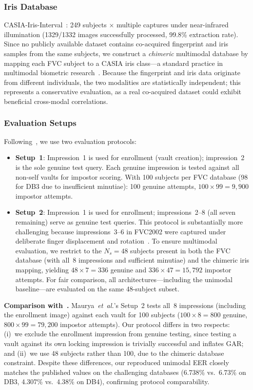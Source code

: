 \documentclass[conference]{IEEEtran}
\begin{document}
\subsubsection{Iris Database}
CASIA-Iris-Interval~\cite{casia_iris}: 249 subjects $\times$ multiple captures under near-infrared illumination (1329/1332 images successfully processed, 99.8\% extraction rate). Since no publicly available dataset contains co-acquired fingerprint and iris samples from the same subjects, we construct a \emph{chimeric} multimodal database by mapping each FVC subject to a CASIA iris class---a standard practice in multimodal biometric research~\cite{ross2003information,nandakumar2008multibiometric}. Because the fingerprint and iris data originate from different individuals, the two modalities are statistically independent; this represents a conservative evaluation, as a real co-acquired dataset could exhibit beneficial cross-modal correlations.

\subsubsection{Evaluation Setups}
Following~\cite{maurya2025enhancing}, we use two evaluation protocols:
\begin{itemize}
    \item \textbf{Setup~1}: Impression~1 is used for enrollment (vault creation); impression~2 is the sole genuine test query. Each genuine impression is tested against all non-self vaults for impostor scoring. With 100 subjects per FVC database (98 for DB3 due to insufficient minutiae): 100 genuine attempts, $100 \times 99 = 9{,}900$ impostor attempts.
    \item \textbf{Setup~2}: Impression~1 is used for enrollment; impressions~2--8 (all seven remaining) serve as genuine test queries. This protocol is substantially more challenging because impressions~3--6 in FVC2002 were captured under deliberate finger displacement and rotation~\cite{maio2002fvc2002}. To ensure multimodal evaluation, we restrict to the $N_s = 48$ subjects present in both the FVC database (with all~8 impressions and sufficient minutiae) and the chimeric iris mapping, yielding $48 \times 7 = 336$ genuine and $336 \times 47 = 15{,}792$ impostor attempts. For fair comparison, all architectures---including the unimodal baseline---are evaluated on the same 48-subject subset.
\end{itemize}

\noindent\textbf{Comparison with~\cite{maurya2025enhancing}.} Maurya~\textit{et~al.}'s Setup~2 tests all~8 impressions (including the enrollment image) against each vault for 100 subjects ($100 \times 8 = 800$ genuine, $800 \times 99 = 79{,}200$ impostor attempts). Our protocol differs in two respects: (i)~we exclude the enrollment impression from genuine testing, since testing a vault against its own locking impression is trivially successful and inflates GAR; and (ii)~we use 48 subjects rather than 100, due to the chimeric database constraint. Despite these differences, our reproduced unimodal EER closely matches the published values on the challenging databases (6.738\% vs.~6.73\% on DB3, 4.307\% vs.~4.38\% on DB4), confirming protocol comparability.
\end{document}
